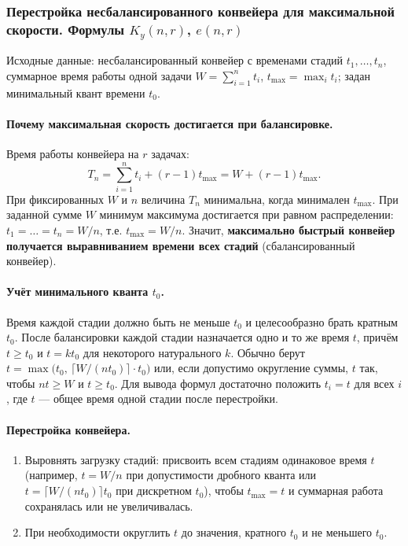 \subsubsection*{Перестройка несбалансированного конвейера для максимальной скорости. Формулы $K_y(n, r)$, $e(n, r)$}

Исходные данные: несбалансированный конвейер с временами стадий $t_1, \ldots, t_n$, суммарное время работы одной задачи $W = \sum_{i=1}^{n} t_i$, $t_{\max} = \max_i t_i$; задан минимальный квант времени $t_0$.

\paragraph{Почему максимальная скорость достигается при балансировке.}
Время работы конвейера на $r$ задачах:
\[
T_n = \sum_{i=1}^{n} t_i + (r - 1) t_{\max} = W + (r - 1) t_{\max}.
\]
При фиксированных $W$ и $n$ величина $T_n$ минимальна, когда минимален $t_{\max}$. При заданной сумме $W$ минимум максимума достигается при равном распределении: $t_1 = \ldots = t_n = W/n$, т.е. $t_{\max} = W/n$. Значит, \textbf{максимально быстрый конвейер получается выравниванием времени всех стадий} (сбалансированный конвейер).

\paragraph{Учёт минимального кванта $t_0$.}
Время каждой стадии должно быть не меньше $t_0$ и целесообразно брать кратным $t_0$. После балансировки каждой стадии назначается одно и то же время $t$, причём $t \geq t_0$ и $t = k t_0$ для некоторого натурального $k$. Обычно берут $t = \max\bigl(t_0,\, \lceil W/(n t_0) \rceil \cdot t_0\bigr)$ или, если допустимо округление суммы, $t$ так, чтобы $n t \geq W$ и $t \geq t_0$. Для вывода формул достаточно положить $t_i = t$ для всех $i$, где $t$ — общее время одной стадии после перестройки.

\paragraph{Перестройка конвейера.}
\begin{enumerate}
    \item Выровнять загрузку стадий: присвоить всем стадиям одинаковое время $t$ (например, $t = W/n$ при допустимости дробного кванта или $t = \lceil W/(n t_0) \rceil t_0$ при дискретном $t_0$), чтобы $t_{\max} = t$ и суммарная работа сохранялась или не увеличивалась.
    \item При необходимости округлить $t$ до значения, кратного $t_0$ и не меньшего $t_0$.
\end{enumerate}

